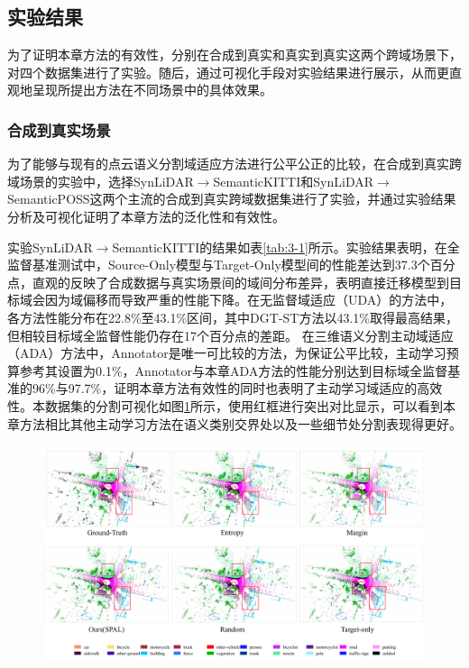 \subsection{实验结果}
为了证明本章方法的有效性，分别在合成到真实和真实到真实这两个跨域场景下，对四个数据集进行了实验。随后，通过可视化手段对实验结果进行展示，从而更直观地呈现所提出方法在不同场景中的具体效果。
\subsubsection{合成到真实场景}
为了能够与现有的点云语义分割域适应方法进行公平公正的比较，在合成到真实跨域场景的实验中，选择SynLiDAR\(\to\)SemanticKITTI和SynLiDAR\(\to\)SemanticPOSS这两个主流的合成到真实跨域数据集进行了实验，并通过实验结果分析及可视化证明了本章方法的泛化性和有效性。

\vspace{-0.1cm}
实验SynLiDAR\(\to\)SemanticKITTI的结果如表\ref{tab:3-1}所示。实验结果表明，在全监督基准测试中，Source-Only模型与Target-Only模型间的性能差达到37.3个百分点，直观的反映了合成数据与真实场景间的域间分布差异，表明直接迁移模型到目标域会因为域偏移而导致严重的性能下降。在无监督域适应（UDA）的方法中，各方法性能分布在22.8\%至43.1\%区间，其中DGT-ST方法以43.1\%取得最高结果，但相较目标域全监督性能仍存在17个百分点的差距。
在三维语义分割主动域适应（ADA）方法中，Annotator是唯一可比较的方法，为保证公平比较，主动学习预算参考其设置为0.1\%，Annotator与本章ADA方法的性能分别达到目标域全监督基准的96\%与97.7\%，证明本章方法有效性的同时也表明了主动学习域适应的高效性。本数据集的分割可视化如图\ref{fig:3-v-1}所示，使用红框进行突出对比显示，可以看到本章方法相比其他主动学习方法在语义类别交界处以及一些细节处分割表现得更好。
\vspace{-0.1cm}
\begin{figure}[H]
    \centering
    \includegraphics[width = \textwidth]{ljx/figure/3_vision_s2k1.pdf}
    \label{fig:3-v-1}
\end{figure}
